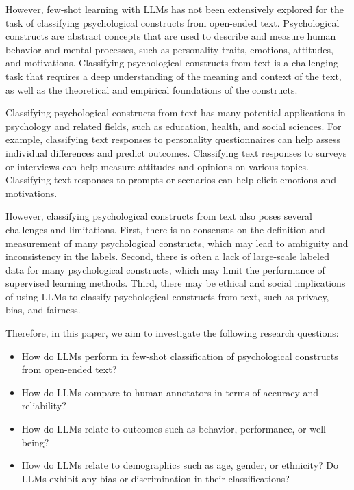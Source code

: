 \documentclass[
  10pt,
  letterpaper,
  DIV=11,
  numbers=noendperiod]{scrartcl}
\providecommand{\tightlist}{%
  \setlength{\itemsep}{0pt}\setlength{\parskip}{0pt}}\usepackage{longtable,booktabs,array}
\begin{document}
However, few-shot learning with LLMs has not been extensively explored
for the task of classifying psychological constructs from open-ended
text. Psychological constructs are abstract concepts that are used to
describe and measure human behavior and mental processes, such as
personality traits, emotions, attitudes, and motivations. Classifying
psychological constructs from text is a challenging task that requires a
deep understanding of the meaning and context of the text, as well as
the theoretical and empirical foundations of the constructs.

Classifying psychological constructs from text has many potential
applications in psychology and related fields, such as education,
health, and social sciences. For example, classifying text responses to
personality questionnaires can help assess individual differences and
predict outcomes. Classifying text responses to surveys or interviews
can help measure attitudes and opinions on various topics. Classifying
text responses to prompts or scenarios can help elicit emotions and
motivations.

However, classifying psychological constructs from text also poses
several challenges and limitations. First, there is no consensus on the
definition and measurement of many psychological constructs, which may
lead to ambiguity and inconsistency in the labels. Second, there is
often a lack of large-scale labeled data for many psychological
constructs, which may limit the performance of supervised learning
methods. Third, there may be ethical and social implications of using
LLMs to classify psychological constructs from text, such as privacy,
bias, and fairness.

Therefore, in this paper, we aim to investigate the following research
questions:

\begin{itemize}
\tightlist
\item
  How do LLMs perform in few-shot classification of psychological
  constructs from open-ended text?
\item
  How do LLMs compare to human annotators in terms of accuracy and
  reliability?
\item
  How do LLMs relate to outcomes such as behavior, performance, or
  well-being?
\item
  How do LLMs relate to demographics such as age, gender, or ethnicity?
  Do LLMs exhibit any bias or discrimination in their classifications?
\end{itemize}
\end{document}
